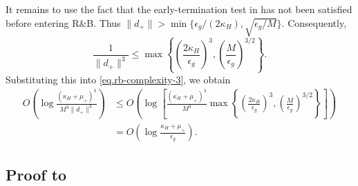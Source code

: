 \documentclass[moor,sglanonrev]{informs4}
\begin{document}
\begin{APPENDICES}
{        It remains to use the fact that the early-termination test in
         has not been satisfied before entering R\&B.
        Thus \(\|d_+\|>\min\{\epsilon_g/(2\kappa_H),
        \sqrt{\epsilon_g/M}\}\). Consequently,
        \[
            \frac{1}{\|d_+\|^3}
            \le
            \max\left\{
            \left(\frac{2\kappa_H}{\epsilon_g}\right)^3,
            \left(\frac{M}{\epsilon_g}\right)^{3/2}
            \right\}.
        \]
        Substituting this into \eqref{eq.rb-complexity-3}, we obtain
        \begin{align*}
            O\left(
            \log
            \frac{
                    (\kappa_H+\mu_+)^3
                }{
                    M^3\|d_+\|^3
                }
            \right)
             & \le
            O\left(
            \log
            \left[
                \frac{(\kappa_H+\mu_+)^3}{M^3}
                \max\left\{
                \left(\frac{2\kappa_H}{\epsilon_g}\right)^3,
                \left(\frac{M}{\epsilon_g}\right)^{3/2}
                \right\}
                \right]
            \right) \\
             & =
            O\left(
            \log\frac{\kappa_H+\mu_+}{\epsilon_g}
            \right).
        \end{align*}
        \Halmos
        \endproof
    }
    \subsection*{Proof to }


\end{APPENDICES}
\end{document}
